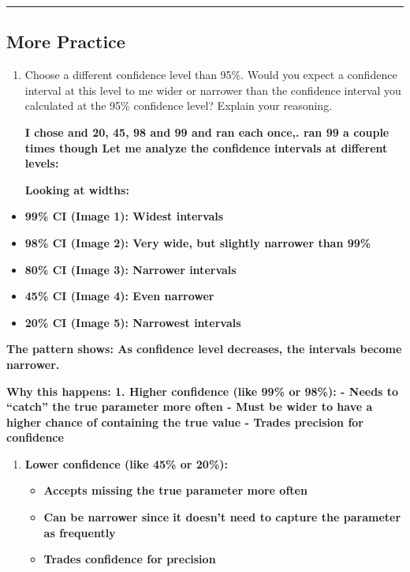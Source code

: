 \documentclass[
]{article}
\providecommand{\tightlist}{%
  \setlength{\itemsep}{0pt}\setlength{\parskip}{0pt}}
\begin{document}
\begin{center}\rule{0.5\linewidth}{0.5pt}\end{center}

\subsection{More Practice}\label{more-practice}

\begin{enumerate}
\def\labelenumi{\arabic{enumi}.}
\item
  Choose a different confidence level than 95\%. Would you expect a
  confidence interval at this level to me wider or narrower than the
  confidence interval you calculated at the 95\% confidence level?
  Explain your reasoning.

  \textbf{I chose and 20, 45, 98 and 99 and ran each once,. ran 99 a
  couple times though Let me analyze the confidence intervals at
  different levels:}

  \textbf{Looking at widths:}
\end{enumerate}

\begin{itemize}
\tightlist
\item
  \textbf{99\% CI (Image 1): Widest intervals}
\item
  \textbf{98\% CI (Image 2): Very wide, but slightly narrower than 99\%}
\item
  \textbf{80\% CI (Image 3): Narrower intervals}
\item
  \textbf{45\% CI (Image 4): Even narrower}
\item
  \textbf{20\% CI (Image 5): Narrowest intervals}
\end{itemize}

\textbf{The pattern shows: As confidence level decreases, the intervals
become narrower.}

\textbf{Why this happens: 1. Higher confidence (like 99\% or 98\%): -
Needs to ``catch'' the true parameter more often - Must be wider to have
a higher chance of containing the true value - Trades precision for
confidence}

\begin{enumerate}
\def\labelenumi{\arabic{enumi}.}
\setcounter{enumi}{1}
\tightlist
\item
  \textbf{Lower confidence (like 45\% or 20\%):}

  \begin{itemize}
  \tightlist
  \item
    \textbf{Accepts missing the true parameter more often}
  \item
    \textbf{Can be narrower since it doesn't need to capture the
    parameter as frequently}
  \item
    \textbf{Trades confidence for precision}
  \end{itemize}
\end{enumerate}
\end{document}
